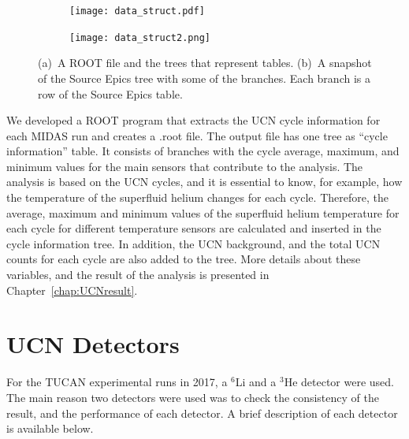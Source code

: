 \begin{figure}
\begin{subfigure}{.45\textwidth}
  \centering
  \texttt{[image: data\_struct.pdf]}
  \caption{}
  \label{fig:sfig1}
\end{subfigure}%
\begin{subfigure}{.45\textwidth}
  \centering
  \texttt{[image: data\_struct2.png]}
  \caption{}
  \label{fig:sfig2}
\end{subfigure}
\caption[TUCAN's data structure]{(a)~A ROOT file and the trees that
  represent tables. (b)~A snapshot of the Source Epics tree with some
  of the branches. Each branch is a row of the Source Epics table. }
\label{fig:data_struct}
\end{figure}

We developed a ROOT program that extracts the UCN cycle information
for each MIDAS run and creates a .root file.  The output file has one
tree as ``cycle information'' table. It consists of branches with the
cycle average, maximum, and minimum values for the main sensors that
contribute to the analysis.  The analysis is based on the UCN cycles,
and it is essential to know, for example, how the temperature of the
superfluid helium changes for each cycle. Therefore, the average,
maximum and minimum values of the superfluid helium temperature for
each cycle for different temperature sensors are calculated and
inserted in the cycle information tree. In addition, the UCN
background, and the total UCN counts for each cycle are also added to
the tree. More details about these variables, and the result of the
analysis is presented in Chapter~\ref{chap:UCNresult}.






\section{UCN Detectors\label{sec:detectors}}
For the TUCAN experimental runs in 2017, a $^6$Li and a $^3$He
detector were used. The main reason two detectors were used was to
check the consistency of the result, and the performance of each
detector. A brief description of each detector is available below.

